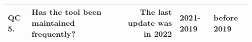 \begin{table}
{\begin{tabular}{|c|l|r|c|l|}
      \hline
      \multicolumn{1}{|l|}{QC 5.}                                                                & Has the tool been maintained frequently?                                                                              & The last update was in 2022  & \multicolumn{1}{l|}{2021-2019} & before 2019                           \\
      \hline
    \end{tabular}
  }
\end{table}